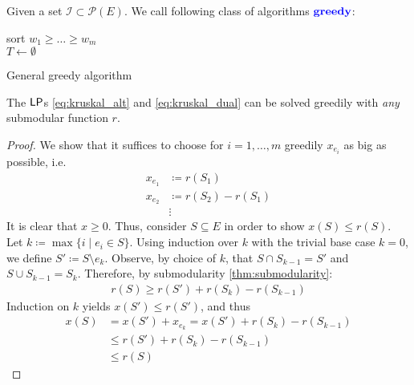 \begin{definition}[Greedy]
    Given a set $\mathcal{I} \subset \mathcal{P}(E)$. We call following class of algorithms
    $\vocab{greedy}$:
    \\
    \begin{algorithm}[H]
        \SetAlgoLined
        sort $w_1 \geq \dots \geq w_m$\\
        $T \leftarrow \emptyset$\\
        \caption{General greedy algorithm}
    \end{algorithm} \noindent
\end{definition}
\begin{theorem}
    The $\mathsf{LP}$s \eqref{eq:kruskal_alt} and \eqref{eq:kruskal_dual}
    can be solved greedily with \emph{any} submodular function $r$.
\end{theorem}
\begin{proof}
    We show that it suffices to choose for $i=1,\dots,m$ greedily $x_{e_i}$ as big as possible, i.e.
    \begin{align*}
        x_{e_1} & \coloneqq r(S_1)        \\
        x_{e_2} & \coloneqq r(S_2)-r(S_1) \\
                & \vdots
    \end{align*}
    It is clear that $x \geq 0$. Thus, consider $S \subseteq E$ in order to show $x(S) \leq r(S)$.
    Let $k \coloneqq \max \{i \mid e_i \in S\}$. Using induction over $k$ with the trivial base case $k=0$,
    we define $S' \coloneqq S \setminus e_k$. Observe, by choice of $k$, that
    $S \cap S_{k-1} = S'$ and $S \cup S_{k-1} = S_k$.
    Therefore, by submodularity \ref{thm:submodularity}:
    \begin{align*}
        r(S) \geq r(S') + r(S_k) - r(S_{k-1})
    \end{align*}
    Induction on $k$ yields $x(S') \leq r(S')$, and thus
    \begin{align*}
        x(S) & = x(S') + x_{e_k}=x(S')+r(S_k)-r(S_{k-1}) \\
             & \leq r(S')+ r(S_k) - r(S_{k-1})           \\
             & \leq r(S)
    \end{align*}
\end{proof}
